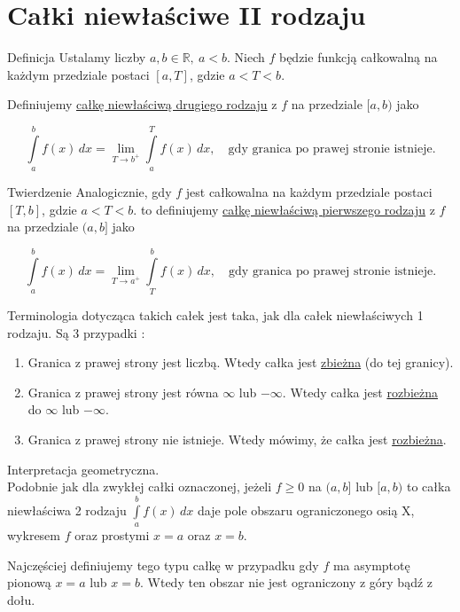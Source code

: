 \section{Całki niewłaściwe II rodzaju}

\begin{tw}{Definicja}
Ustalamy liczby $ a,b \in \mathbb{R}, \ a < b $. Niech $f$ będzie funkcją całkowalną na każdym przedziale postaci $[a, T] $,
gdzie $ a < T < b $. 

Definiujemy \underline{całkę niewłaściwą drugiego rodzaju} z $f$ na przedziale $[a, b)$ jako

\[ \int\limits_{a}^{b} f(x) \,dx = \lim_{T \to b^+} \int\limits_{a}^{T} f(x) \,dx, \quad \textrm{gdy granica po prawej stronie istnieje.}\]
\end{tw}

\begin{tw}{Twierdzenie}
Analogicznie, gdy $f$ jest całkowalna na każdym przedziale postaci $[T,b]$, gdzie $ a < T < b $. to definiujemy
\underline{całkę niewłaściwą pierwszego rodzaju} z $f$ na przedziale $(a, b]$ jako

\[ \int\limits_{a}^{b} f(x) \,dx = \lim_{T \to a^+} \int\limits_{T}^{b} f(x) \,dx, \quad \textrm{gdy granica po prawej stronie istnieje.}\]
\end{tw}

Terminologia dotycząca takich całek jest taka, jak dla całek niewłaściwych 1 rodzaju. Są 3 przypadki : 

\begin{enumerate}
    \item Granica z prawej strony jest liczbą. Wtedy całka jest \underline{zbieżna} (do tej granicy).
    \item Granica z prawej strony jest równa $\infty$ lub $-\infty$. Wtedy całka jest \underline{rozbieżna} do $\infty$ lub $-\infty$.
    \item Granica z prawej strony nie istnieje. Wtedy mówimy, że całka jest \underline{rozbieżna}. \\
\end{enumerate}

Interpretacja geometryczna. \\

Podobnie jak dla zwykłej całki oznaczonej, jeżeli $f \geq 0$ na $(a,b]$ lub $[a,b)$ to całka niewłaściwa 2 rodzaju
$ \int\limits_{a}^{b} f(x) \,dx $ daje pole obszaru ograniczonego osią X, wykresem $f$ oraz prostymi $x=a$ oraz $x=b$.

Najczęściej definiujemy tego typu całkę w przypadku gdy $f$ ma asymptotę pionową $x=a$ lub $x=b$. Wtedy ten obszar
nie jest ograniczony z góry bądź z dołu. \\

